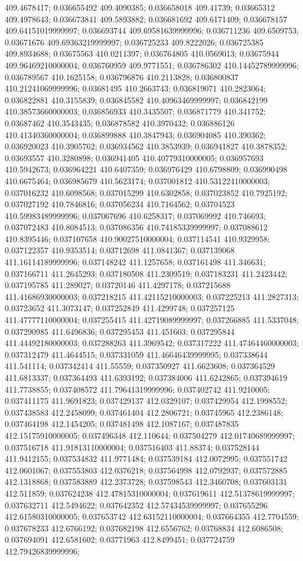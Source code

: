 409.4678417; 0.036655492 409.4090385; 0.036658018 409.41739; 0.03665312 409.4978643; 0.036673841 409.5893882; 0.036681692 409.6171409; 0.036678157 409.64151019999997; 0.036693744 409.69581639999996; 0.036711236 409.6509753; 0.03671676 409.69363219999997; 0.036725233 409.8222026; 0.036725385 409.8934688; 0.03675563 410.0211397; 0.036764805 410.0569013; 0.03675944 409.96469210000004; 0.036760959 409.9771551; 0.036786302 410.14452789999996; 0.036789567 410.1625158; 0.036796876 410.2113828; 0.036800837 410.21241069999996; 0.03681495 410.2663743; 0.036819071 410.2823064; 0.036822881 410.3155839; 0.036845582 410.40963469999997; 0.036842199 410.38573660000003; 0.036856933 410.3435507; 0.036871779 410.341752; 0.03687462 410.3543435; 0.036878582 410.3970432; 0.036886126 410.41340360000004; 0.036899888 410.3847943; 0.036904085 410.390362; 0.036920023 410.3905762; 0.036934562 410.3853939; 0.036941827 410.3878352; 0.03693557 410.3280898; 0.036941405 410.40779310000005; 0.036957693 410.5942673; 0.036964221 410.6407359; 0.036976429 410.6798809; 0.036990498 410.6675464; 0.036985679 410.5623174; 0.037001812 410.53122410000003; 0.037016232 410.6098568; 0.037015299 410.6302858; 0.037023852 410.7925192; 0.037027192 410.7846816; 0.037056234 410.7164562; 0.03704523 410.59983489999996; 0.037067696 410.6258317; 0.037069992 410.746693; 0.037072483 410.8084513; 0.037086356 410.74185339999997; 0.037088612 410.8395446; 0.037107658 410.90027510000004; 0.037114541 410.9329958; 0.037122357 410.9353514; 0.03712698 411.0841367; 0.037139068 411.16114189999996; 0.037148242 411.1257658; 0.037161498 411.346631; 0.037166711 411.2645293; 0.037180508 411.2309519; 0.037183231 411.2423442; 0.037195785 411.289027; 0.03720146 411.4297178; 0.037215688 411.41686930000003; 0.037218215 411.42115210000003; 0.037225213 411.2827313; 0.03723652 411.3073147; 0.037252849 411.4299748; 0.037257125 411.47777110000004; 0.037255415 411.42719089999997; 0.037266885 411.5337048; 0.037290985 411.6496836; 0.037295453 411.451603; 0.037295844 411.44492180000003; 0.037288263 411.3969542; 0.037317222 411.47464460000003; 0.037312479 411.4644515; 0.037331059 411.46646439999995; 0.037338644 411.541114; 0.037342414 411.55559; 0.037350927 411.6623608; 0.037364529 411.6813337; 0.037364493 411.6393192; 0.037384006 411.6242865; 0.037394619 411.7738855; 0.037408572 411.79641319999996; 0.037402742 411.9210005; 0.037411175 411.9691823; 0.037429137 412.0329107; 0.037429954 412.1998552; 0.037438583 412.2458099; 0.037461404 412.2806721; 0.03745965 412.2386148; 0.037464198 412.1454205; 0.037481498 412.1087167; 0.037487835 412.15175910000005; 0.037496348 412.110644; 0.037504279 412.01740689999997; 0.037516718 411.91813110000004; 0.037516403 411.88374; 0.037528144 411.9412155; 0.037534832 411.9771484; 0.037539184 412.0072995; 0.037551742 412.0601067; 0.037553803 412.0376218; 0.037564998 412.0792937; 0.037572885 412.1318868; 0.037583889 412.2373728; 0.037598543 412.3460708; 0.037603131 412.511859; 0.037624238 412.47815310000004; 0.037619611 412.51378619999997; 0.037632711 412.5494622; 0.037642352 412.57434539999997; 0.037655296 412.61580310000005; 0.037653742 412.63152110000004; 0.037664355 412.7704559; 0.037678233 412.6766192; 0.037682198 412.6556762; 0.03768834 412.6086508; 0.037694091 412.6581602; 0.03771963 412.8499451; 0.037724759 412.79426839999996; 